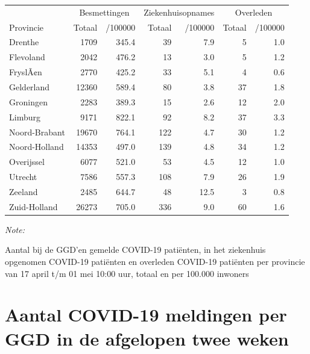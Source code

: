 \documentclass[
  english,
  man,floatsintext]{apa6}
\begin{document}
\begin{table}
\centering
\begin{threeparttable}
\begin{tabular}{lrrrrrr}
\toprule
\multicolumn{1}{c}{ } & \multicolumn{2}{c}{Besmettingen} & \multicolumn{2}{c}{Ziekenhuisopnames} & \multicolumn{2}{c}{Overleden} \\
\cmidrule(l{3pt}r{3pt}){2-3} \cmidrule(l{3pt}r{3pt}){4-5} \cmidrule(l{3pt}r{3pt}){6-7}
Provincie & Totaal & /100000 & Totaal & /100000 & Totaal & /100000\\
\midrule
Drenthe & 1709 & 345.4 & 39 & 7.9 & 5 & 1.0\\
Flevoland & 2042 & 476.2 & 13 & 3.0 & 5 & 1.2\\
FryslÃ¢n & 2770 & 425.2 & 33 & 5.1 & 4 & 0.6\\
Gelderland & 12360 & 589.4 & 80 & 3.8 & 37 & 1.8\\
Groningen & 2283 & 389.3 & 15 & 2.6 & 12 & 2.0\\
Limburg & 9171 & 822.1 & 92 & 8.2 & 37 & 3.3\\
Noord-Brabant & 19670 & 764.1 & 122 & 4.7 & 30 & 1.2\\
Noord-Holland & 14353 & 497.0 & 139 & 4.8 & 34 & 1.2\\
Overijssel & 6077 & 521.0 & 53 & 4.5 & 12 & 1.0\\
Utrecht & 7586 & 557.3 & 108 & 7.9 & 26 & 1.9\\
Zeeland & 2485 & 644.7 & 48 & 12.5 & 3 & 0.8\\
Zuid-Holland & 26273 & 705.0 & 336 & 9.0 & 60 & 1.6\\
\bottomrule
\end{tabular}
\begin{tablenotes}
\item \textit{Note: } 
\item Aantal bij de GGD’en gemelde COVID-19 patiënten, in het ziekenhuis opgenomen COVID-19 patiënten en overleden COVID-19 patiënten per provincie van 17 april t/m 01 mei 10:00 uur, totaal en per 100.000 inwoners
\end{tablenotes}
\end{threeparttable}
\end{table}

\newpage

\hypertarget{aantal-covid-19-meldingen-per-ggd-in-de-afgelopen-twee-weken}{%
\section{Aantal COVID-19 meldingen per GGD in de afgelopen twee weken}\label{aantal-covid-19-meldingen-per-ggd-in-de-afgelopen-twee-weken}}
\end{document}

